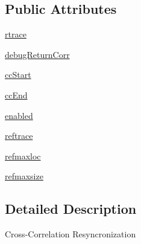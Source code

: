 \subsection*{Public Attributes}
\begin{DoxyCompactItemize}
\item 
\hyperlink{classsoftware_1_1chipwhisperer_1_1analyzer_1_1preprocessing_1_1ResyncCrossCorrelation_1_1ResyncCrossCorrelation_ac3f40be30a03d875cfda9424a5e279e8}{rtrace}
\item 
\hyperlink{classsoftware_1_1chipwhisperer_1_1analyzer_1_1preprocessing_1_1ResyncCrossCorrelation_1_1ResyncCrossCorrelation_af10bc83fcb8bca318376d322a394e329}{debug\+Return\+Corr}
\item 
\hyperlink{classsoftware_1_1chipwhisperer_1_1analyzer_1_1preprocessing_1_1ResyncCrossCorrelation_1_1ResyncCrossCorrelation_a32ed170b0bee2aa337df895c937055db}{cc\+Start}
\item 
\hyperlink{classsoftware_1_1chipwhisperer_1_1analyzer_1_1preprocessing_1_1ResyncCrossCorrelation_1_1ResyncCrossCorrelation_aa769c0472faa96b6f26789f71fe5d06f}{cc\+End}
\item 
\hyperlink{classsoftware_1_1chipwhisperer_1_1analyzer_1_1preprocessing_1_1ResyncCrossCorrelation_1_1ResyncCrossCorrelation_a3874af5f74706b4c19b2d5572221f0d6}{enabled}
\item 
\hyperlink{classsoftware_1_1chipwhisperer_1_1analyzer_1_1preprocessing_1_1ResyncCrossCorrelation_1_1ResyncCrossCorrelation_aaf4a2af4ddd3499398f6e2cd162f3cf7}{reftrace}
\item 
\hyperlink{classsoftware_1_1chipwhisperer_1_1analyzer_1_1preprocessing_1_1ResyncCrossCorrelation_1_1ResyncCrossCorrelation_a64cc985011fb96fec6197345db95c84b}{refmaxloc}
\item 
\hyperlink{classsoftware_1_1chipwhisperer_1_1analyzer_1_1preprocessing_1_1ResyncCrossCorrelation_1_1ResyncCrossCorrelation_a9f1de425aea20cb2d8727f0b7ef68a48}{refmaxsize}
\end{DoxyCompactItemize}


\subsection{Detailed Description}
\begin{DoxyVerb}Cross-Correlation Resyncronization
\end{DoxyVerb}
 

